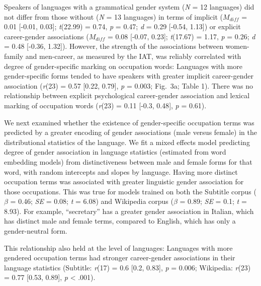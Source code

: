 \documentclass[9pt,twocolumn]{pnas-new}
\begin{document}
Speakers of languages with a grammatical gender system (\emph{N} = 12 languages) did not differ from those without (\emph{N} = 13 languages) in terms of implicit ($M_{diff}$ = 0.01 {[}-0.01, 0.03{]}; \emph{t}(22.99) = 0.74, \emph{p} = 0.47; \emph{d} = 0.29 {[}-0.54, 1.13{]}) or explicit career-gender associations ($M_{diff}$ = 0.08 {[}-0.07, 0.23{]}; \emph{t}(17.67) = 1.17, \emph{p} = 0.26; \emph{d} = 0.48 {[}-0.36, 1.32{]}). However, the strength of the associations between women-family and men-career, as measured by the IAT, was reliably correlated with degree of gender-specific marking on
occupation words: Languages with more gender-specific forms tended to
have speakers with greater implicit career-gender association (\emph{r}(23) = 0.57 {[}0.22, 0.79{]}, \emph{p} = 0.003; Fig.\ 3a; Table 1). There
was no relationship between explicit psychological career-gender association and
lexical marking of occupation words (\emph{r}(23) = 0.11 {[}-0.3, 0.48{]}, \emph{p} = 0.61).

We next examined whether the existence of gender-specific occupation terms was predicted by a greater encoding of gender associations (male versus female) in the distributional statistics of the language. We fit a mixed effects model predicting degree of gender association in language statistics (estimated from word embedding models) from distinctiveness between male and female forms for that word, with random intercepts and slopes by language. Having more distinct occupation terms was associated with greater linguistic gender association for those occupations. This was true for models trained on both the Subtitle corpus (\(\beta\) = 0.46; \emph{SE} = 0.08; \emph{t} = 6.08) and Wikipedia
corpus (\(\beta\) = 0.89; \emph{SE} = 0.1; \emph{t} = 8.93). For example, \enquote{secretary} has a greater gender association in Italian, which has distinct male and female terms, compared to English, which has only a gender-neutral form. 

This relationship also held at the level of languages: Languages with more
gendered occupation terms had stronger career-gender associations in their language statistics
(Subtitle: \emph{r}(17) = 0.6 {[}0.2, 0.83{]}, \emph{p} = 0.006; Wikipedia: \emph{r}(23) = 0.77 {[}0.53, 0.89{]}, \emph{p} \textless{} .001).
\end{document}

